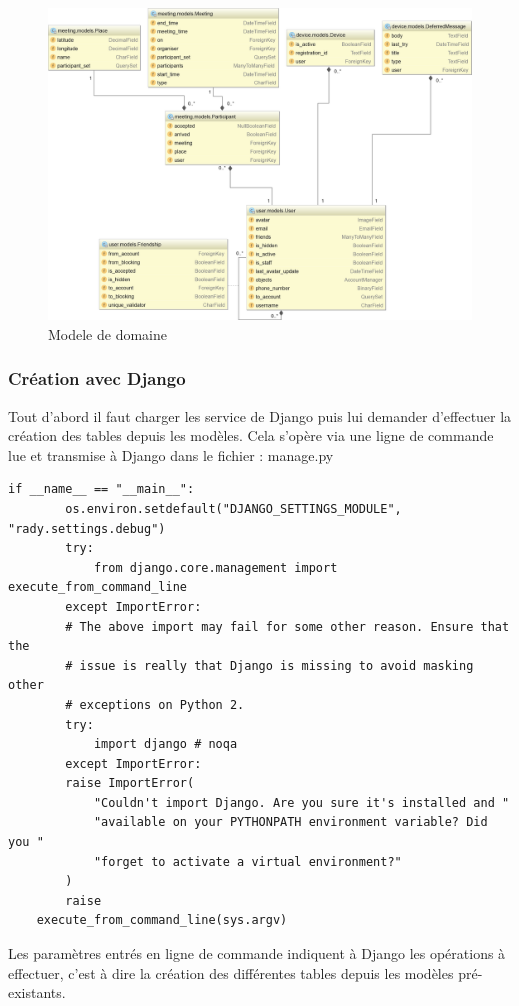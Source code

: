 \documentclass[french]{article}
\begin{document}
	\begin{figure}[H]
		\centering
		\includegraphics[scale=0.45]{../schema/modele-domaine.png}
		\caption{Modele de domaine}
		\label{Modele de domaine}
	\end{figure}
	
	\subsubsection{Création avec Django}	
	
	Tout d'abord il faut charger les service de Django puis lui demander d'effectuer la création des tables depuis les modèles. Cela s'opère via une ligne de commande lue et transmise à Django dans le fichier : manage.py
	
	\begin{lstlisting}[style=py]
	if __name__ == "__main__":
		os.environ.setdefault("DJANGO_SETTINGS_MODULE", "rady.settings.debug")
		try:
			from django.core.management import execute_from_command_line
		except ImportError:
		# The above import may fail for some other reason. Ensure that the
		# issue is really that Django is missing to avoid masking other
		# exceptions on Python 2.
		try:
			import django # noqa
		except ImportError:
		raise ImportError(
			"Couldn't import Django. Are you sure it's installed and "
			"available on your PYTHONPATH environment variable? Did you "
			"forget to activate a virtual environment?"
		)
		raise
	execute_from_command_line(sys.argv)	
	\end{lstlisting}
	
	Les paramètres entrés en ligne de commande indiquent à Django les opérations à effectuer, c'est à dire la création des différentes tables depuis les modèles pré-existants.
	
\end{document}
